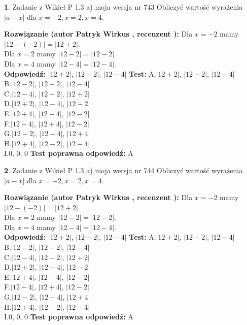 \documentclass[12pt, a4paper]{article}
\theoremstyle{definition} %
\newtheorem{zad}{}
\newcommand{\zadStart}[1]{\begin{zad}#1\newline}
\newcommand{\zadStop}{\end{zad}}
\newcommand{\rozwStart}[2]{\noindent \textbf{Rozwiązanie (autor #1 , recenzent #2): }\newline}
\newcommand{\rozwStop}{\newline}
\newcommand{\odpStart}{\noindent \textbf{Odpowiedź:}\newline}
\newcommand{\odpStop}{\newline}
\newcommand{\testStart}{\noindent \textbf{Test:}\newline}
\newcommand{\testStop}{\newline}
\newcommand{\kluczStart}{\noindent \textbf{Test poprawna odpowiedź:}\newline}
\newcommand{\kluczStop}{\newline}
\begin{document}
\zadStart{Zadanie z Wikieł P 1.3 a) moja wersja nr 743}
Obliczyć wartość wyrażenia $|a - x|$ dla $x=-2,x=2,x=4$.
\zadStop
\rozwStart{Patryk Wirkus}{}
Dla $x = -2$ mamy $|12 - (-2)| = |12 + 2|$.\\
Dla $x = 2$ mamy $|12 - 2| = |12 - 2|$.\\
Dla $x = 4$ mamy $|12 - 4| = |12 - 4|$.\\
\rozwStop
\odpStart
$|12 + 2|$, $|12 - 2|$, $|12 - 4|$
\odpStop
\testStart
A.$|12 + 2|$, $|12 - 2|$, $|12 - 4|$\\
B.$|12 - 2|$, $|12 + 2|$, $|12 - 4|$\\
C.$|12 - 4|$, $|12 - 2|$, $|12 + 2|$\\
D.$|12 + 2|$, $|12 - 4|$, $|12 - 2|$\\
E.$|12 + 4|$, $|12 - 4|$, $|12 - 2|$\\
F.$|12 - 4|$, $|12 + 4|$, $|12 - 2|$\\
G.$|12 - 2|$, $|12 - 4|$, $|12 + 4|$\\
H.$|12 + 4|$, $|12 - 2|$, $|12 - 4|$\\
I.$0$, $0$, $0$
\testStop
\kluczStart
A
\kluczStop



\zadStart{Zadanie z Wikieł P 1.3 a) moja wersja nr 744}
Obliczyć wartość wyrażenia $|a - x|$ dla $x=-2,x=2,x=4$.
\zadStop
\rozwStart{Patryk Wirkus}{}
Dla $x = -2$ mamy $|12 - (-2)| = |12 + 2|$.\\
Dla $x = 2$ mamy $|12 - 2| = |12 - 2|$.\\
Dla $x = 4$ mamy $|12 - 4| = |12 - 4|$.\\
\rozwStop
\odpStart
$|12 + 2|$, $|12 - 2|$, $|12 - 4|$
\odpStop
\testStart
A.$|12 + 2|$, $|12 - 2|$, $|12 - 4|$\\
B.$|12 - 2|$, $|12 + 2|$, $|12 - 4|$\\
C.$|12 - 4|$, $|12 - 2|$, $|12 + 2|$\\
D.$|12 + 2|$, $|12 - 4|$, $|12 - 2|$\\
E.$|12 + 4|$, $|12 - 4|$, $|12 - 2|$\\
F.$|12 - 4|$, $|12 + 4|$, $|12 - 2|$\\
G.$|12 - 2|$, $|12 - 4|$, $|12 + 4|$\\
H.$|12 + 4|$, $|12 - 2|$, $|12 - 4|$\\
I.$0$, $0$, $0$
\testStop
\kluczStart
A
\kluczStop
\end{document}
